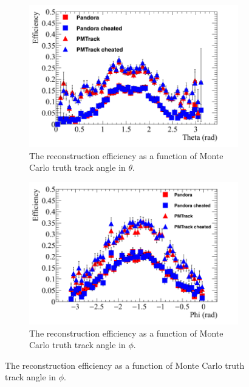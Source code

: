 \begin{figure}[h!]
\begin{subfigure}{0.48\textwidth}
        \centering
        \includegraphics[width=\textwidth]{Effic_ProtonEnrich_500V_Proton_Theta}
        \caption{The reconstruction efficiency as a function of Monte Carlo truth track angle in $\theta$.}
        \label{fig:Prot_Effic_Theta}
  \end{subfigure}%
  \hspace{0.03\textwidth}%
  \begin{subfigure}{0.48\textwidth}
        \centering
        \includegraphics[width=\textwidth]{Effic_ProtonEnrich_500V_Proton_Phi}
        \caption{The reconstruction efficiency as a function of Monte Carlo truth track angle in $\phi$.}
        \label{fig:Prot_Effic_Phi}
  \end{subfigure}

\end{figure}
